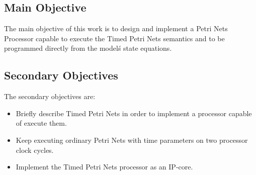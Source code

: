 	\subsection{Main Objective}
	
		The main objective of this work is to design and implement a Petri Nets Processor capable 
		to execute the Timed Petri Nets semantics and to be programmed directly from the model\'s 
		state equations.
	
	\subsection{Secondary Objectives}
	
		The secondary objectives are:
		\begin{itemize}
		  	\item Briefly describe Timed Petri Nets in order to implement a processor capable of execute 
		  		them.
		  	\item Keep executing ordinary Petri Nets with time parameters on two processor clock cycles.
		  	\item Implement the Timed Petri Nets processor as an IP-core.
		\end{itemize}	
